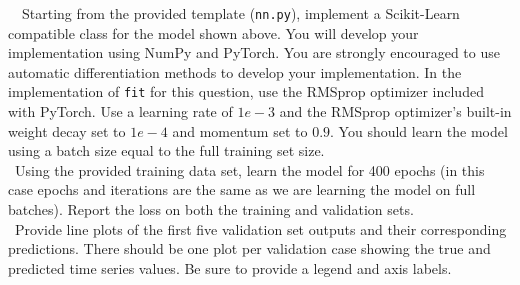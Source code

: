 \documentclass[11pt]{article}
\begin{document}
\begin{problem}{20}
~~Starting from the provided template (\verb|nn.py|), implement a Scikit-Learn compatible class for the model shown above. You will develop your implementation using NumPy and PyTorch. You are strongly encouraged to use automatic differentiation methods to develop your implementation. In the implementation of \verb|fit| for this question, use the RMSprop optimizer included with PyTorch. Use a learning rate of $1e-3$ and the RMSprop optimizer's built-in weight decay set to $1e-4$ and momentum set to $0.9$. You should learn the model using a batch size equal to the full training set size.\\

 ~Using the provided training data set, learn the model for 400 epochs (in this case epochs and iterations are the same as we are learning the model on full batches). Report the loss on both the training and validation sets.\\

 ~Provide line plots of the first five validation set outputs and their corresponding predictions. There should be one plot per validation case showing the true and predicted time series values. Be sure to provide a legend and axis labels.\\

\end{problem}
\end{document}
